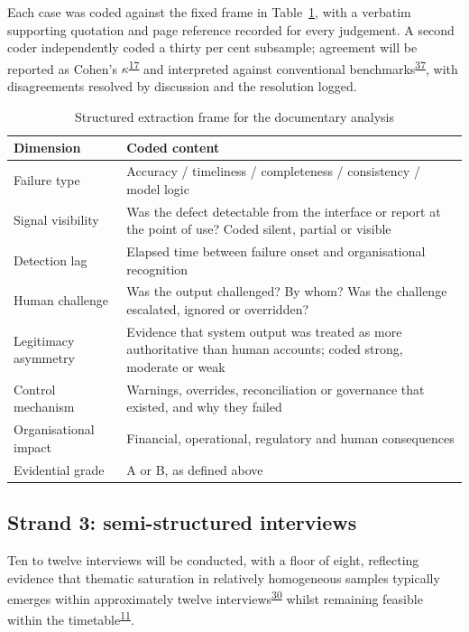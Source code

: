 \documentclass[11pt,a4paper]{article}
\numberwithin{figure}{section}
\numberwithin{table}{section}
\begin{document}
Each case was coded against the fixed frame in Table~\ref{tab:frame}, with a verbatim supporting quotation
and page reference recorded for every judgement. A second coder independently coded a thirty per cent
subsample; agreement will be reported as Cohen's $\kappa$\textsuperscript{\hyperlink{ref17}{17}} and interpreted against conventional
benchmarks\textsuperscript{\hyperlink{ref37}{37}}, with disagreements resolved by discussion and the resolution logged.

\begin{table}[H]
\centering\small
\caption{Structured extraction frame for the documentary analysis}
\label{tab:frame}
\begin{tabularx}{\textwidth}{@{}p{3.4cm} X@{}}
\toprule
\textbf{Dimension} & \textbf{Coded content} \\
\midrule
Failure type & Accuracy / timeliness / completeness / consistency / model logic \\
Signal visibility & Was the defect detectable from the interface or report at the point of use? Coded
silent, partial or visible \\
Detection lag & Elapsed time between failure onset and organisational recognition \\
Human challenge & Was the output challenged? By whom? Was the challenge escalated, ignored or overridden? \\
Legitimacy asymmetry & Evidence that system output was treated as more authoritative than human accounts;
coded strong, moderate or weak \\
Control mechanism & Warnings, overrides, reconciliation or governance that existed, and why they failed \\
Organisational impact & Financial, operational, regulatory and human consequences \\
Evidential grade & A or B, as defined above \\
\bottomrule
\end{tabularx}
\end{table}

\subsection{Strand 3: semi-structured interviews}

Ten to twelve interviews will be conducted, with a floor of eight, reflecting evidence that thematic
saturation in relatively homogeneous samples typically emerges within approximately twelve
interviews\textsuperscript{\hyperlink{ref30}{30}} whilst remaining feasible within the timetable\textsuperscript{\hyperlink{ref11}{11}}.
\end{document}
